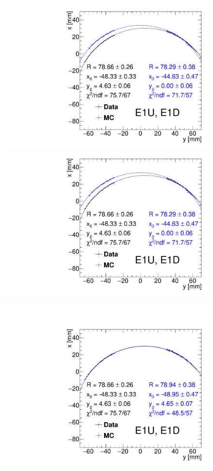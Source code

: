 \begin{figure}[ht]\ContinuedFloat\centering%
	\parbox{0.495\textwidth}{
		\centering
		\includegraphics[width=\linewidth,page=3]{graphics/rpSim/Apertures_swapedAxes_withFit_beforeDxShift.pdf}\\[10pt]
		\includegraphics[width=\linewidth,page=4]{graphics/rpSim/Apertures_swapedAxes_withFit_beforeDxShift.pdf}
	}~
	\parbox{0.495\textwidth}{
		\centering
		\includegraphics[width=\linewidth,page=3]{graphics/rpSim/Apertures_swapedAxes_withFit.pdf}\\[10pt]
}
\end{figure}
